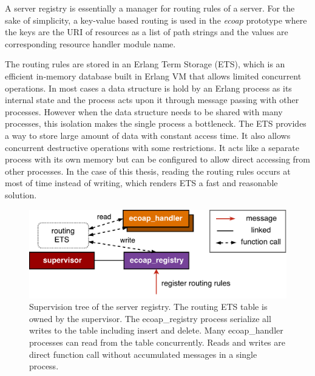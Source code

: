 A server registry is essentially a manager for routing rules of a server. For the sake of simplicity, a key-value based routing is used in the \textit{ecoap} prototype where the keys are the URI of resources as a list of path strings and the values are corresponding resource handler module name. 

The routing rules are stored in an Erlang Term Storage (ETS), which is an efficient in-memory database built in Erlang VM that allows limited concurrent operations. In most cases a data structure is hold by an Erlang process as its internal state and the process acts upon it through message passing with other processes. However when the data structure needs to be shared with many processes, this isolation makes the single process a bottleneck. The ETS provides a way to store large amount of data with constant access time. It also allows concurrent destructive operations with some restrictions. It acts like a separate process with its own memory but can be configured to allow direct accessing from other processes. In the case of this thesis, reading the routing rules occurs at most of time instead of writing, which renders ETS a fast and reasonable solution. 

\begin{figure}[!htbp]
\centering
\includegraphics[scale = 0.55]{coap_registry}
\caption{Supervision tree of the server registry. The routing ETS table is owned by the supervisor. The ecoap\_registry process serialize all writes to the table including insert and delete. Many ecoap\_handler processes can read from the table concurrently. Reads and writes are direct function call without accumulated messages in a single process.}
\label{fig:coap_registry}
\end{figure}
 

